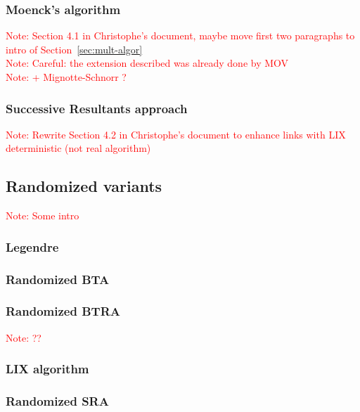 \documentclass{article}
\newcounter{algo}
\newcommand{\Notes}[1]{\textcolor{red}{Note: #1}}
\begin{document}
\subsubsection{Moenck's algorithm}
\label{sec:Moenck}
\Notes{Section 4.1 in Christophe's document, maybe move first two paragraphs to intro of Section~\ref{sec:mult-algor}}\\
\noindent \Notes{Careful: the extension described was already done by MOV}\\
\noindent\Notes{+ Mignotte-Schnorr ?}

\subsubsection{Successive Resultants approach}
\label{sec:LIX}
\Notes{Rewrite Section 4.2 in Christophe's document to enhance links with LIX deterministic (not real algorithm)}



\subsection{Randomized variants}
\label{sec:randomized-variants}

\Notes{Some intro}

\subsubsection{Legendre}
\label{sec:legendre}

\subsubsection{Randomized BTA}
\label{sec:BTArand}

\subsubsection{Randomized BTRA}
\label{sec:BTRArand}
\Notes{??}

\subsubsection{LIX algorithm}
\label{sec:LIXrand}

\subsubsection{Randomized SRA}
\label{sec:SRArand}
\end{document}
